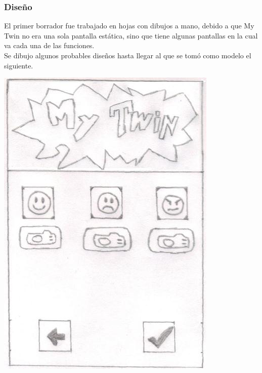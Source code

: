 \documentclass[12pt]{article}
\begin{document}
{{{\begin{flushleft}
\end{flushleft}


\newpage
\begin{flushleft}
\subsubsection{Dise\~no}
\normalsize
El primer borrador fue trabajado en hojas con dibujos a mano, debido a que My Twin no era una sola pantalla est\'atica, sino que tiene algunas pantallas en la cual va cada una de las funciones.\\
Se dibujo algunos probables dise\~nos hasta llegar al que se tom\'o como modelo el siguiente.\\
\vspace{0.3in}
\begin{center}
\includegraphics[scale=0.42]{imagenes_android/Twin1}

\end{center}
\end{flushleft}}}}
\end{document}
